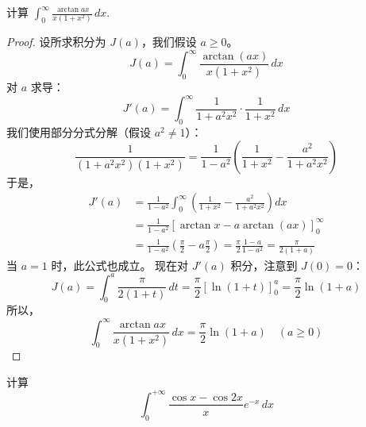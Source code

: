 \documentclass[lang=cn,10pt,thmcnt=section]{elegantbook}
\begin{document}
	\begin{example}
	计算 \( \int_{0}^{\infty} \frac{\arctan ax}{x(1+x^2)} \, dx \).
	\end{example}
	\begin{proof}
		设所求积分为 $J(a)$，我们假设 $a \ge 0$。
\[ J(a) = \int_{0}^{\infty} \frac{\arctan(ax)}{x(1+x^2)} \, dx \]
对 $a$ 求导：
\[ J'(a) = \int_{0}^{\infty} \frac{1}{1+a^2x^2} \cdot \frac{1}{1+x^2} \, dx \]
我们使用部分分式分解（假设 $a^2 \neq 1$）：
\[ \frac{1}{(1+a^2x^2)(1+x^2)} = \frac{1}{1-a^2} \left( \frac{1}{1+x^2} - \frac{a^2}{1+a^2x^2} \right) \]
于是，
\begin{align*}
J'(a) &= \frac{1}{1-a^2} \int_{0}^{\infty} \left( \frac{1}{1+x^2} - \frac{a^2}{1+a^2x^2} \right) dx \\
&= \frac{1}{1-a^2} \left[ \arctan x - a \arctan(ax) \right]_{0}^{\infty} \\
&= \frac{1}{1-a^2} \left( \frac{\pi}{2} - a \frac{\pi}{2} \right) = \frac{\pi}{2} \frac{1-a}{1-a^2} = \frac{\pi}{2(1+a)}
\end{align*}
当 $a=1$ 时，此公式也成立。
现在对 $J'(a)$ 积分，注意到 $J(0)=0$：
\[ J(a) = \int_{0}^{a} \frac{\pi}{2(1+t)} \, dt = \frac{\pi}{2} [\ln(1+t)]_{0}^{a} = \frac{\pi}{2} \ln(1+a) \]
所以，
\[ \int_{0}^{\infty} \frac{\arctan ax}{x(1+x^2)} \, dx = \frac{\pi}{2} \ln(1+a) \quad (a \ge 0) \]

	\end{proof}
\begin{example}
	计算
	\[\int_{0}^{+\infty}\frac{\cos x-\cos 2x}{x}e^{-x}  \,dx 
	\]
\end{example}
\end{document}
